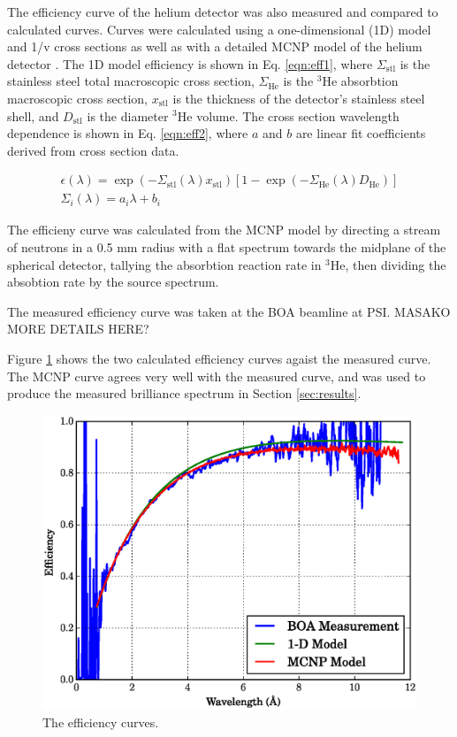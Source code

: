 \documentclass[5p,12pt]{elsarticle}
\begin{document}
The efficiency curve of the helium detector was also measured and compared to calculated curves.  Curves were calculated using a one-dimensional (1D) model and 1/v cross sections as well as with a detailed MCNP model of the helium detector \cite{bonner_manual}.  The 1D model efficiency is shown in Eq. \ref{eqn:eff1}, where $\Sigma_{\textrm{stl}}$ is the stainless steel total macroscopic cross section, $\Sigma_{\textrm{He}}$ is the $^3$He absorbtion macroscopic cross section, $x_{\textrm{stl}}$ is the thickness of the detector's stainless steel shell, and  $D_{\textrm{stl}}$ is the diameter $^3$He volume.  The cross section wavelength dependence is shown in Eq. \ref{eqn:eff2}, where $a$ and $b$ are linear fit coefficients derived from cross section data.  

\begin{gather}
     \label{eqn:eff1} \epsilon(\lambda) = \exp \left(-\Sigma_{\textrm{stl}}(\lambda) x_{\textrm{stl}}\right)[1-\exp(-\Sigma_{\textrm{He}}(\lambda) D_{\textrm{He}})] \\
     \label{eqn:eff2} \Sigma_i(\lambda) = a_i\lambda+b_i
\end{gather}

The efficieny curve was calculated from the MCNP model by directing a stream of neutrons in a 0.5 mm radius with a flat spectrum towards the midplane of the spherical detector, tallying the absorbtion reaction rate in $^{3}$He, then dividing the absobtion rate by the source spectrum.  

The measured efficiency curve was taken at the BOA beamline at PSI.  MASAKO MORE DETAILS HERE?

Figure \ref{fig:eff} shows the two calculated efficiency curves agaist the measured curve.  The MCNP curve agrees very well with the measured curve, and was used to produce the measured brilliance spectrum in Section \ref{sec:results}.

\begin{figure}[h!] 
  \centering
    \includegraphics[width=\columnwidth]{graphics/eff.eps}
     \caption{The efficiency curves. \label{fig:eff} }
\end{figure}
\end{document}
